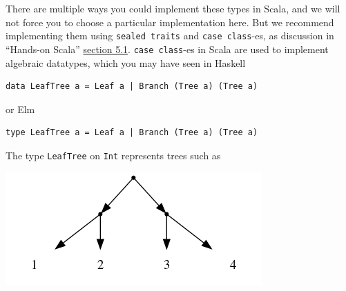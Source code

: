 \documentclass[11pt]{article}
\begin{document}
There are multiple ways you could implement these types in Scala,
and we will not force you to choose a particular implementation here.
But we recommend implementing them using \texttt{sealed traits} and \texttt{case class}-es,
as discussion in “Hands-on Scala”
\href{https://www.handsonscala.com/chapter-5-notable-scala-features.html\#section-5-1-case-classes-and-sealed-traits}{section 5.1}.
\texttt{case class}-es in Scala are used to implement algebraic datatypes,
which you may have seen in Haskell
\begin{verbatim}
data LeafTree a = Leaf a | Branch (Tree a) (Tree a)
\end{verbatim}
or Elm
\begin{verbatim}
type LeafTree a = Leaf a | Branch (Tree a) (Tree a)
\end{verbatim}

The type \texttt{LeafTree} on \texttt{Int} represents trees such as
\begin{center}
\includegraphics[width=\textwidth]{media/LeafTree.png}
\end{center}
\end{document}

